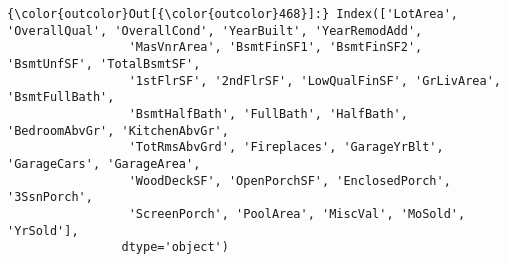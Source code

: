 \documentclass[11pt]{article}
\begin{document}
\begin{Verbatim}[commandchars=\\\{\}]
{\color{outcolor}Out[{\color{outcolor}468}]:} Index(['LotArea', 'OverallQual', 'OverallCond', 'YearBuilt', 'YearRemodAdd',
                 'MasVnrArea', 'BsmtFinSF1', 'BsmtFinSF2', 'BsmtUnfSF', 'TotalBsmtSF',
                 '1stFlrSF', '2ndFlrSF', 'LowQualFinSF', 'GrLivArea', 'BsmtFullBath',
                 'BsmtHalfBath', 'FullBath', 'HalfBath', 'BedroomAbvGr', 'KitchenAbvGr',
                 'TotRmsAbvGrd', 'Fireplaces', 'GarageYrBlt', 'GarageCars', 'GarageArea',
                 'WoodDeckSF', 'OpenPorchSF', 'EnclosedPorch', '3SsnPorch',
                 'ScreenPorch', 'PoolArea', 'MiscVal', 'MoSold', 'YrSold'],
                dtype='object')
\end{Verbatim}
            
\end{document}
